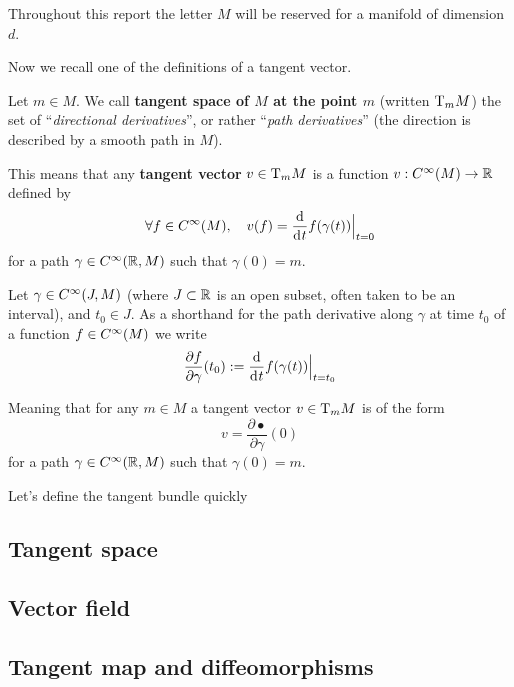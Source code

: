     Throughout this report the letter $M$ will be reserved for a manifold of dimension $d$.

	Now we recall one of the definitions of a tangent vector.

	\begin{definition}
		Let $m \in M$.
		We call \textbf{tangent space of $M$ at the point $m$} (written $\mathrm{T}_m{M}$) the set of ``\emph{directional derivatives}'', or rather ``\emph{path derivatives}'' (the direction is described by a smooth path in $M$).
        
		This means that any \textbf{tangent vector} $v \in \mathrm{T}_m{M}$ is a function $v: C^\infty(M) \to \mathbb{R}$ defined by
		$$
			\forall f \in \Cinf(M), \quad v(f) = \frac{\d}{\di{t}} f(\gamma(t)) \Big|_{t=0}
		$$
		for a path $\gamma \in C^\infty(\mathbb{R}, M)$ such that $\gamma(0) = m$.
	\end{definition}

	\begin{notation}
		Let $\gamma \in C^\infty(J, M)$ (where $J \subset \mathbb{R}$ is an open subset, often taken to be an interval), and $t_0 \in J$.
		As a shorthand for the path derivative along $\gamma$ at time $t_0$ of a function $f \in C^\infty(M)$ we write 
		$$
			\frac{\partial f}{\partial \gamma}(t_0) := \frac{\d}{\di{t}} f(\gamma(t)) \Big|_{t=t_0}
		$$

		Meaning that for any $m \in M$ a tangent vector $v \in \mathrm{T}_m{M}$ is of the form
		$$
			v = \frac{\partial \bullet}{\partial \gamma}(0)
		$$
		for a path $\gamma \in C^\infty(\mathbb{R}, M)$ such that $\gamma(0) = m$.
	\end{notation}


	Let's define the tangent bundle quickly

    

	\subsection{Tangent space}
        

	\subsection{Vector field}

	\subsection{Tangent map and diffeomorphisms}


